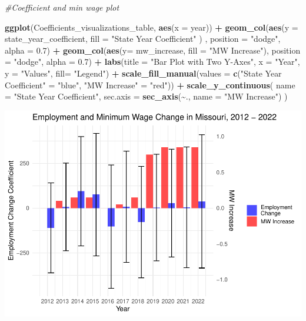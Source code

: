\documentclass[
]{article}
\newenvironment{Shaded}{\begin{snugshade}}{\end{snugshade}}
\newcommand{\AttributeTok}[1]{\textcolor[rgb]{0.13,0.29,0.53}{#1}}
\newcommand{\CommentTok}[1]{\textcolor[rgb]{0.56,0.35,0.01}{\textit{#1}}}
\newcommand{\FloatTok}[1]{\textcolor[rgb]{0.00,0.00,0.81}{#1}}
\newcommand{\FunctionTok}[1]{\textcolor[rgb]{0.13,0.29,0.53}{\textbf{#1}}}
\newcommand{\NormalTok}[1]{#1}
\newcommand{\OtherTok}[1]{\textcolor[rgb]{0.56,0.35,0.01}{#1}}
\newcommand{\SpecialCharTok}[1]{\textcolor[rgb]{0.81,0.36,0.00}{\textbf{#1}}}
\newcommand{\StringTok}[1]{\textcolor[rgb]{0.31,0.60,0.02}{#1}}
\begin{document}
\begin{Shaded}
\begin{Highlighting}[]
\CommentTok{\#Coefficient and min wage plot}

\FunctionTok{ggplot}\NormalTok{(Coefficients\_visualizations\_table, }\FunctionTok{aes}\NormalTok{(}\AttributeTok{x =}\NormalTok{ year)) }\SpecialCharTok{+} \FunctionTok{geom\_col}\NormalTok{(}\FunctionTok{aes}\NormalTok{(}\AttributeTok{y =}\NormalTok{ state\_year\_coefficient, }\AttributeTok{fill =} \StringTok{"State Year Coefficient"}\NormalTok{ ) , }\AttributeTok{position =} \StringTok{"dodge"}\NormalTok{, }\AttributeTok{alpha =} \FloatTok{0.7}\NormalTok{) }\SpecialCharTok{+} \FunctionTok{geom\_col}\NormalTok{(}\FunctionTok{aes}\NormalTok{(}\AttributeTok{y=}\NormalTok{ mw\_increase, }\AttributeTok{fill =} \StringTok{"MW Increase"}\NormalTok{), }\AttributeTok{position =} \StringTok{"dodge"}\NormalTok{, }\AttributeTok{alpha =} \FloatTok{0.7}\NormalTok{) }\SpecialCharTok{+}
\FunctionTok{labs}\NormalTok{(}\AttributeTok{title =} \StringTok{"Bar Plot with Two Y{-}Axes"}\NormalTok{,}
       \AttributeTok{x =} \StringTok{"Year"}\NormalTok{,}
       \AttributeTok{y =} \StringTok{"Values"}\NormalTok{, }\AttributeTok{fill=} \StringTok{"Legend"}\NormalTok{) }\SpecialCharTok{+}
 \FunctionTok{scale\_fill\_manual}\NormalTok{(}\AttributeTok{values =} \FunctionTok{c}\NormalTok{(}\StringTok{"State Year Coefficient"} \OtherTok{=} \StringTok{"blue"}\NormalTok{, }\StringTok{"MW Increase"} \OtherTok{=} \StringTok{"red"}\NormalTok{)) }\SpecialCharTok{+}
  \FunctionTok{scale\_y\_continuous}\NormalTok{(}
    \AttributeTok{name =} \StringTok{"State Year Coefficient"}\NormalTok{,}
    \AttributeTok{sec.axis =} \FunctionTok{sec\_axis}\NormalTok{(}\SpecialCharTok{\textasciitilde{}}\NormalTok{., }\AttributeTok{name =} \StringTok{"MW Increase"}\NormalTok{)}
\NormalTok{  )}
\end{Highlighting}
\end{Shaded}

\includegraphics{regressions_files/figure-latex/unnamed-chunk-19-1.pdf}
\end{document}
